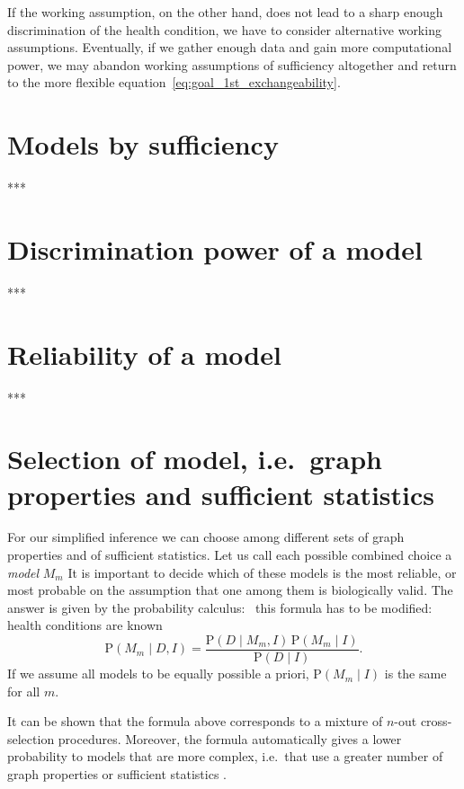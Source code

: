 \documentclass[\ifafour a4paper,12pt,\else a5paper,10pt,\fi%
onecolumn,oneside,article,%
british%
]{memoir}
\theoremstyle{remark}
\theoremstyle{innote}
\newcommand*{\citep}{\parencites}
\newcommand*{\p}{\mathrm{P}}%
\renewcommand*{\|}{\mathpunct{|}}
\newcommand*{\ie}{{i.e.}}
\newcommand*{\puzzle}{\maltese}
\newcommand{\mynote}[1]{ {\footnotesize\color{notecolour}\puzzle\ #1} }
\newcommand*{\yD}{D}
\newcommand*{\yI}{I}
\newcommand*{\yM}{M}
\theoremstyle{plain}
\begin{document}
If the working assumption, on the other hand, does not lead to a sharp
enough discrimination of the health condition, we have to consider
alternative working assumptions. Eventually, if we gather enough data and
gain more computational power, we may abandon working assumptions of
sufficiency altogether and return to the more flexible
equation~\eqref{eq:goal_1st_exchangeability}.


\section{Models by sufficiency}
\label{sec:sufficiency}

***

\section{Discrimination power of a model}
\label{sec:discrimination}

***

\section{Reliability of a model}
\label{sec:reliability}

***

\section{Selection of model, \ie\ graph properties and sufficient statistics}
\label{sec:model_selection}

For our simplified inference we can choose among different sets of graph
properties and of sufficient statistics. Let us call each possible combined
choice a \emph{model} $\yM_m$ It is important to decide which of these
models is the most reliable, or most probable on the assumption that one
among them is biologically valid. The answer is given by the probability
calculus:\mynote{this formula has to be modified: health conditions are known}
\begin{equation}
  \label{eq:model_selection}
  \p(\yM_m \| \yD, \yI) =
  \frac{
\p(\yD \| \yM_m, \yI)\, \p(\yM_m \| \yI)
}{ \p(\yD \| \yI)}.
\end{equation}
If we assume all models to be equally possible a priori, $\p(\yM_m \| \yI)$
is the same for all $m$.

It can be shown that the formula above corresponds to a mixture of $n$-out
cross-selection procedures. Moreover, the formula automatically gives a
lower probability to models that are more complex, \ie\ that use a greater
number of graph properties or sufficient statistics \citep{mackay1992}.
\end{document}
